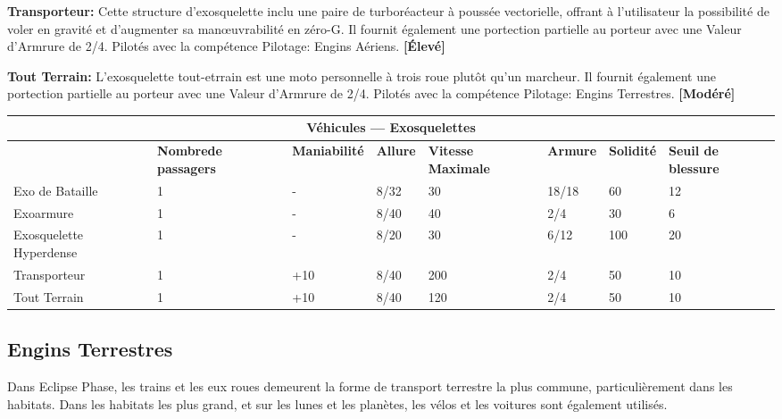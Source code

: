 \textbf{Transporteur:} Cette structure d'exosquelette inclu une paire de turboréacteur à poussée vectorielle, offrant à l'utilisateur la possibilité de voler en gravité et d'augmenter sa manœuvrabilité en zéro-G. Il fournit également une portection partielle au porteur avec une Valeur d'Armrure de 2/4. Pilotés avec la compétence Pilotage: Engins Aériens. \textbf{[Élevé]} 

\textbf{Tout Terrain:} L'exosquelette tout-etrrain est une moto personnelle à trois roue plutôt qu'un marcheur. Il fournit également une portection partielle au porteur avec une Valeur d'Armrure de 2/4. Pilotés avec la compétence Pilotage: Engins Terrestres. \textbf{[Modéré]} 

\begin{table} \begin{tabularx}{\textwidth}{|X|X|X|X|X|X|X|X|} \hline

\multicolumn{8}{|c|}{\textbf{Véhicules --- Exosquelettes}} \\ \hline

&\textbf{Nombre\newline de passagers}	&\textbf{Maniabilité}	&\textbf{Allure}	&\textbf{Vitesse Maximale}	&\textbf{Armure}	&\textbf{Solidité}	&\textbf{Seuil de blessure} \\ \hline

Exo de Bataille	&1	&- &8/32	&30	&18/18	&60	&12 \\ \hline

Exoarmure	&1	&- &8/40	&40	&2/4	&30	&6 \\ \hline

Exosquelette Hyperdense	&1	&- &8/20	&30	&6/12	&100	&20 \\ \hline

Transporteur	&1	&+10	&8/40	&200	&2/4	&50	&10 \\ \hline

Tout Terrain	&1	&+10	&8/40	&120	&2/4	&50	&10 \\ \hline

\end{tabularx} \label{tab:exoskeletons} \end{table} 

\subsection{Engins Terrestres} \label{sec:groundcraft} 

Dans Eclipse Phase, les trains et les eux roues demeurent la forme de transport terrestre la plus commune, particulièrement dans les habitats. Dans les habitats les plus grand, et sur les lunes et les planètes, les vélos et les voitures sont également utilisés. 

